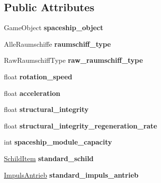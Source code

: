 \subsection*{Public Attributes}
\begin{DoxyCompactItemize}
\item 
\mbox{\label{class_raumschiff_a13b5ed367ccd34c9ec7d858e16dae9c0}} 
Game\+Object {\bfseries spaceship\+\_\+object}
\item 
\mbox{\label{class_raumschiff_a2f79484050d4b56b6fd9df720d238993}} 
Alle\+Raumschiffe {\bfseries raumschiff\+\_\+type}
\item 
\mbox{\label{class_raumschiff_a659c52a5c5edafdcd5a1037e8de702b1}} 
Raw\+Raumschiff\+Type {\bfseries raw\+\_\+raumschiff\+\_\+type}
\item 
\mbox{\label{class_raumschiff_a1a501e3647610a5063ba3dd1fb9cc674}} 
float {\bfseries rotation\+\_\+speed}
\item 
\mbox{\label{class_raumschiff_ac202d93ddf5e5268f6478861b2d9de1f}} 
float {\bfseries acceleration}
\item 
\mbox{\label{class_raumschiff_a24df546f3c65617cd58b9d2c53c1f8ea}} 
float {\bfseries structural\+\_\+integrity}
\item 
\mbox{\label{class_raumschiff_a75098f93eaeaf0ff69fcf7c3f0c92388}} 
float {\bfseries structural\+\_\+integrity\+\_\+regeneration\+\_\+rate}
\item 
\mbox{\label{class_raumschiff_a0314ea93eea80dd23d2bd97b1795e37b}} 
int {\bfseries spaceship\+\_\+module\+\_\+capacity}
\item 
\mbox{\label{class_raumschiff_aa293761e8a0e9e2698fcf4394d1b90bd}} 
\hyperlink{class_schild_item}{Schild\+Item} {\bfseries standard\+\_\+schild}
\item 
\mbox{\label{class_raumschiff_af739a49bc5077a058e041ec335ea1f4b}} 
\hyperlink{class_impuls_antrieb}{Impuls\+Antrieb} {\bfseries standard\+\_\+impuls\+\_\+antrieb}

\end{DoxyCompactItemize}
